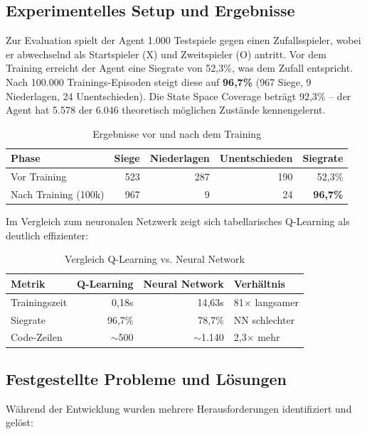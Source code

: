 \subsection{Experimentelles Setup und Ergebnisse}

Zur Evaluation spielt der Agent 1.000 Testspiele gegen einen Zufallsspieler, wobei er abwechselnd als Startspieler (X) und Zweitspieler (O) antritt. Vor dem Training erreicht der Agent eine Siegrate von 52,3\%, was dem Zufall entspricht. Nach 100.000 Trainings-Episoden steigt diese auf \textbf{96,7\%} (967 Siege, 9 Niederlagen, 24 Unentschieden). Die State Space Coverage beträgt 92,3\% -- der Agent hat 5.578 der 6.046 theoretisch möglichen Zustände kennengelernt.

\begin{table}[H]
\centering
\begin{tabular}{l|r|r|r|r}
\textbf{Phase} & \textbf{Siege} & \textbf{Niederlagen} & \textbf{Unentschieden} & \textbf{Siegrate} \\
\hline
Vor Training & 523 & 287 & 190 & 52,3\% \\
Nach Training (100k) & 967 & 9 & 24 & \textbf{96,7\%} \\
\end{tabular}
\caption{Ergebnisse vor und nach dem Training}
\end{table}

Im Vergleich zum neuronalen Netzwerk zeigt sich tabellarisches Q-Learning als deutlich effizienter:

\begin{table}[H]
\centering
\begin{tabular}{l|r|r|l}
\textbf{Metrik} & \textbf{Q-Learning} & \textbf{Neural Network} & \textbf{Verhältnis} \\
\hline
Trainingszeit & 0,18s & 14,63s & 81$\times$ langsamer \\
Siegrate & 96,7\% & 78,7\% & NN schlechter \\
Code-Zeilen & $\sim$500 & $\sim$1.140 & 2,3$\times$ mehr \\
\end{tabular}
\caption{Vergleich Q-Learning vs. Neural Network}
\end{table}

\subsection{Festgestellte Probleme und Lösungen}

Während der Entwicklung wurden mehrere Herausforderungen identifiziert und gelöst:


